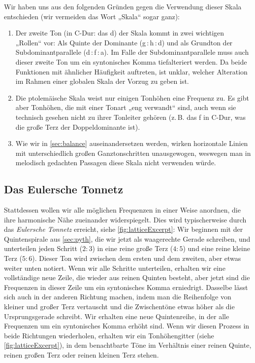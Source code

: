 Wir haben uns aus den folgenden Gründen gegen die Verwendung dieser Skala
entschieden (wir vermeiden das Wort „Skala“ sogar ganz):
\begin{enumerate}
\item Der zweite Ton (in C-Dur: das d) der Skala kommt in zwei wichtigen
  „Rollen“ vor: Als Quinte der Dominante (g\,:\,h\,:\,d) und als Grundton der
  Subdominantparallele (d\,:\,f\,:\,a). Im Falle der Subdominantparallele muss auch
  dieser zweite Ton um ein syntonisches Komma tiefalteriert werden. Da beide
  Funktionen mit ähnlicher Häufigkeit auftreten, ist unklar, welcher Alteration
  im Rahmen einer globalen Skala der Vorzug zu geben ist.
\item Die ptolemäische Skala weist nur einigen Tonhöhen eine Frequenz zu. Es
  gibt aber Tonhöhen, die mit einer Tonart „eng verwandt“ sind, auch wenn sie
  technisch gesehen nicht zu ihrer Tonleiter gehören (z.\,B. das \sharp f in
  C-Dur, was die große Terz der Doppeldominante ist).
\item Wie wir in \cref{sec:balance} auseinandersetzen werden, wirken horizontale
  Linien mit unterschiedlich großen Ganztonschritten unausgewogen, weswegen man
  in melodisch gedachten Passagen diese Skala nicht verwenden würde.
\end{enumerate}

\subsection{Das Eulersche Tonnetz}

Stattdessen wollen wir alle möglichen Frequenzen in einer Weise anordnen, die
ihre harmonische Nähe zueinander widerspiegelt. Dies wird typischerweise durch
das \emph{Eulersche Tonnetz} erreicht, siehe \cref{fig:latticeExcerpt}: Wir
beginnen mit der Quintenspirale aus \cref{sec:pyth}, die wir jetzt als
waagerechte Gerade schreiben, und unterteilen jeden Schritt ($2:3$) in eine
reine große Terz ($4:5$) und eine reine kleine Terz ($5:6$). Dieser Ton wird
zwischen dem ersten und dem zweiten, aber etwas weiter unten notiert. Wenn wir
alle Schritte unterteilen, erhalten wir eine vollständige neue Zeile, die wieder
aus reinen Quinten besteht, aber jetzt sind die Frequenzen in dieser Zeile um
ein syntonisches Komma erniedrigt. Dasselbe lässt sich auch in der anderen
Richtung machen, indem man die Reihenfolge von kleiner und großer Terz
vertauscht und die Zwischentöne etwas höher als die Ursprungsgerade
schreibt. Wir erhalten eine neue Quintenreihe, in der alle Frequenzen um ein
syntonisches Komma erhöht sind. Wenn wir diesen Prozess in beide Richtungen
wiederholen, erhalten wir ein Tonhöhengitter (siehe \cref{fig:latticeExcerpt}),
in dem benachtbarte Töne im Verhältnis einer reinen Quinte, reinen großen Terz
oder reinen kleinen Terz stehen.

